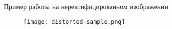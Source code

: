 \begin{frame}{Пример работы на неректифицированном изображении}
\begin{figure}
    \centering
    \texttt{[image: distorted-sample.png]}
\end{figure}
\end{frame}